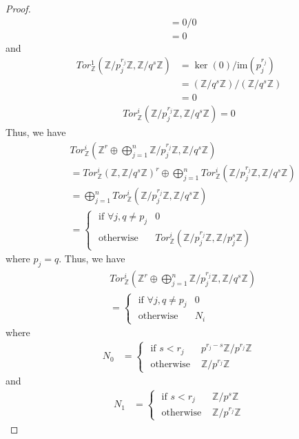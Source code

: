 \documentclass[12pt]{extarticle}
\newcommand{\im}{\text{im}}
\newcommand{\Z}{\mathbb{Z}}
\newcommand{\<}{\langle}
\renewcommand{\>}{\rangle}
\theoremstyle{definition}
\begin{document}
\begin{proof}
\begin{align*}
    &= 0/0 \\
    &= 0
  \end{align*}
  and
  \begin{align*}
    Tor_{\Z}^1(\Z/p_j^{r_j}\Z, \Z/q^s\Z) &= \ker(0)/\im(p_j^{r_j}) \\
    &= (\Z/q^s\Z)/(\Z/q^s\Z) \\
    &= 0 
  \end{align*}
  \begin{align*}
    Tor_{\Z}^i(\Z/p_j^{r_j}\Z, \Z/q^s\Z) = 0
  \end{align*}
  Thus, we have
  \begin{align*}
    &Tor_{\Z}^i(\Z^r \oplus \bigoplus\limits_{j=1}^n \Z/p_j^{r_j}\Z, \Z/q^s\Z)  \\
    &= Tor_{\Z}^i(\Z, \Z/q^s\Z)^r \oplus \bigoplus\limits_{j=1}^n Tor_{\Z}^i(\Z/p_j^{r_j}\Z, \Z/q^s\Z) \\
    &= \bigoplus\limits_{j=1}^n Tor_{\Z}^i(\Z/p_j^{r_j}\Z, \Z/q^s\Z) \\
    &= 
    \begin{cases}
      \text { if } \forall j, q \neq p_j & 0 \\
      \text { otherwise } & Tor_{\Z}^i(\Z/p_j^{r_j}\Z, \Z/p_j^s\Z)
    \end{cases}
  \end{align*}
  where $p_j = q$. 
  Thus, we have
  \begin{align*}
    &Tor_{\Z}^i(\Z^r \oplus \bigoplus\limits_{j=1}^n \Z/p_j^{r_j}\Z, \Z/q^s\Z)  \\
    &=
    \begin{cases}
      \text { if } \forall j, q \neq p_j & 0 \\
      \text { otherwise } & N_i
    \end{cases}
  \end{align*}
  where
  \begin{align*}
    N_0 &=
    \begin{cases}
      \text{ if } s<r_j & p^{r_j-s}\Z/ p^{r_j} \Z \\
      \text{ otherwise } & \Z / p^{r_j} \Z
    \end{cases}
  \end{align*}
  and
  \begin{align*}
    N_1 &=
    \begin{cases}
      \text{ if } s<r_j & \Z/ p^s \Z \\
      \text{ otherwise } & \Z / p^{r_j} \Z      
    \end{cases}
  \end{align*}
\end{proof}
\end{document}
